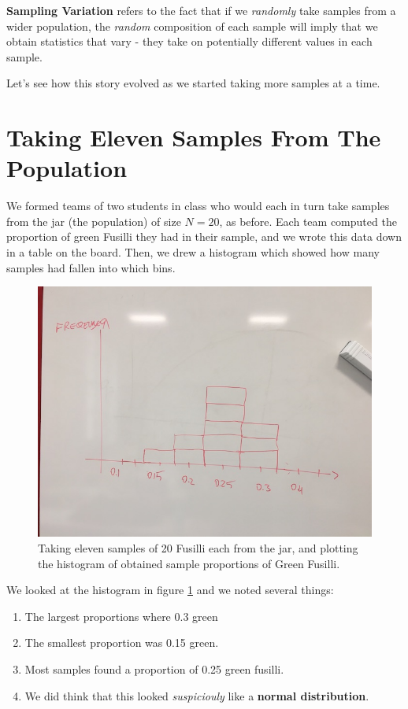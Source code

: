 \documentclass[]{book}
\providecommand{\tightlist}{%
  \setlength{\itemsep}{0pt}\setlength{\parskip}{0pt}}
\newenvironment{note}{\begin{tcolorbox}[colback=blue!5!white,colframe=blue!75!black]}{\end{tcolorbox}}
\begin{document}
\begin{note}
\textbf{Sampling Variation} refers to the fact that if we
\emph{randomly} take samples from a wider population, the \emph{random}
composition of each sample will imply that we obtain statistics that
vary - they take on potentially different values in each sample.
\end{note}

Let's see how this story evolved as we started taking more samples at a
time.

\section{Taking Eleven Samples From The
Population}\label{taking-eleven-samples-from-the-population}

We formed teams of two students in class who would each in turn take
samples from the jar (the population) of size \(N=20\), as before. Each
team computed the proportion of green Fusilli they had in their sample,
and we wrote this data down in a table on the board. Then, we drew a
histogram which showed how many samples had fallen into which bins.

\begin{figure}
\includegraphics[width=0.9\linewidth]{images/pasta6} \caption{Taking eleven samples of 20 Fusilli each from the jar, and plotting the histogram of obtained sample proportions of Green Fusilli.}\label{fig:pasta6}
\end{figure}

We looked at the histogram in figure \ref{fig:pasta6} and we noted
several things:

\begin{enumerate}
\def\labelenumi{\arabic{enumi}.}
\tightlist
\item
  The largest proportions where 0.3 green
\item
  The smallest proportion was 0.15 green.
\item
  Most samples found a proportion of 0.25 green fusilli.
\item
  We did think that this looked \emph{suspiciouly} like a \textbf{normal
  distribution}.
\end{enumerate}
\end{document}
